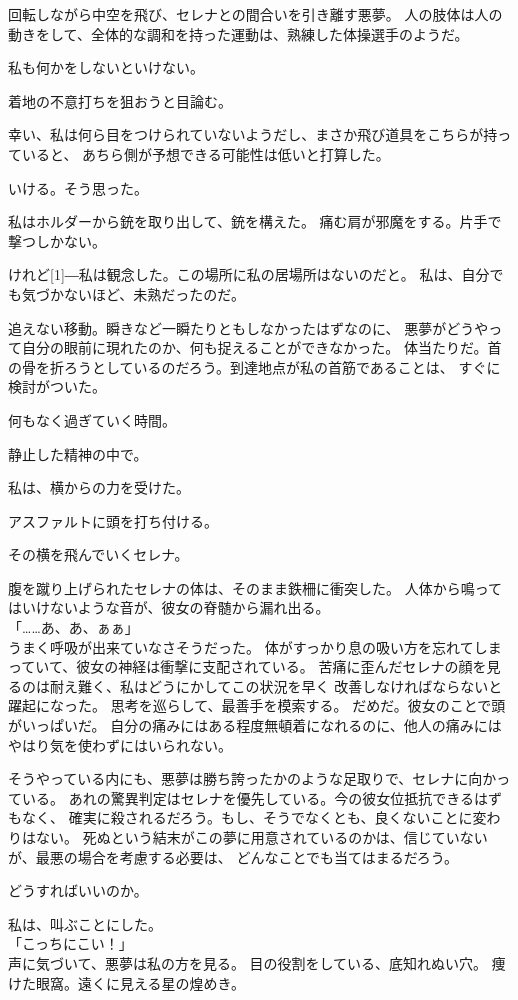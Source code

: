 \documentclass[../IHMain]{subfiles}
\begin{document}
回転しながら中空を飛び、セレナとの間合いを引き離す悪夢。
人の肢体は人の動きをして、全体的な調和を持った運動は、熟練した体操選手のようだ。

私も何かをしないといけない。

着地の不意打ちを狙おうと目論む。

幸い、私は何ら目をつけられていないようだし、まさか飛び道具をこちらが持っていると、
あちら側が予想できる可能性は低いと打算した。

いける。そう思った。

私はホルダーから銃を取り出して、銃を構えた。
痛む肩が邪魔をする。片手で撃つしかない。

けれど\scalebox{3}[1]{―}私は観念した。この場所に私の居場所はないのだと。
私は、自分でも気づかないほど、未熟だったのだ。

追えない移動。瞬きなど一瞬たりともしなかったはずなのに、
悪夢がどうやって自分の眼前に現れたのか、何も捉えることができなかった。
体当たりだ。首の骨を折ろうとしているのだろう。到達地点が私の首筋であることは、
すぐに検討がついた。

何もなく過ぎていく時間。

静止した精神の中で。

私は、横からの力を受けた。

アスファルトに頭を打ち付ける。

その横を飛んでいくセレナ。

腹を蹴り上げられたセレナの体は、そのまま鉄柵に衝突した。
人体から鳴ってはいけないような音が、彼女の脊髄から漏れ出る。\\
「……あ、あ、ぁぁ」\\
うまく呼吸が出来ていなさそうだった。
体がすっかり息の吸い方を忘れてしまっていて、彼女の神経は衝撃に支配されている。
苦痛に歪んだセレナの顔を見るのは耐え難く、私はどうにかしてこの状況を早く
改善しなければならないと躍起になった。
思考を巡らして、最善手を模索する。
だめだ。彼女のことで頭がいっぱいだ。
自分の痛みにはある程度無頓着になれるのに、他人の痛みにはやはり気を使わずにはいられない。

そうやっている内にも、悪夢は勝ち誇ったかのような足取りで、セレナに向かっている。
あれの驚異判定はセレナを優先している。今の彼女位抵抗できるはずもなく、
確実に殺されるだろう。もし、そうでなくとも、良くないことに変わりはない。
死ぬという結末がこの夢に用意されているのかは、信じていないが、最悪の場合を考慮する必要は、
どんなことでも当てはまるだろう。

どうすればいいのか。

私は、叫ぶことにした。\\
「こっちにこい！」\\
声に気づいて、悪夢は私の方を見る。
目の役割をしている、底知れぬい穴。
痩けた眼窩。遠くに見える星の煌めき。
\end{document}

